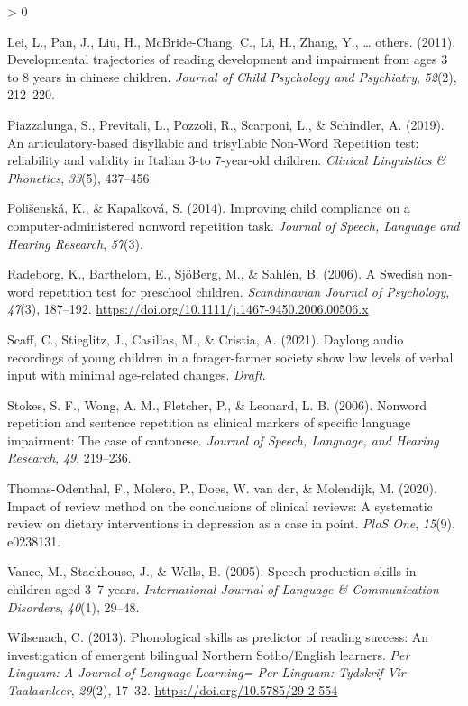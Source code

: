 \documentclass[
  american,
  ,doc,floatsintext]{apa6}
\newlength{\cslhangindent}
\newenvironment{CSLReferences}[2] %
 {%
  \setlength{\parindent}{0pt}
  \ifodd #1 \everypar{\setlength{\hangindent}{\cslhangindent}}\ignorespaces\fi
  \ifnum #2 > 0
  \setlength{\parskip}{#2\baselineskip}
  \fi
 }%
 {}
\begin{document}
\begin{CSLReferences}{1}{0}
\leavevmode\hypertarget{ref-lei2011developmental}{}%
Lei, L., Pan, J., Liu, H., McBride-Chang, C., Li, H., Zhang, Y., \ldots{} others. (2011). Developmental trajectories of reading development and impairment from ages 3 to 8 years in chinese children. \emph{Journal of Child Psychology and Psychiatry}, \emph{52}(2), 212--220.

\leavevmode\hypertarget{ref-piazzalunga2019articulatory}{}%
Piazzalunga, S., Previtali, L., Pozzoli, R., Scarponi, L., \& Schindler, A. (2019). {An articulatory-based disyllabic and trisyllabic Non-Word Repetition test: reliability and validity in Italian 3-to 7-year-old children}. \emph{Clinical Linguistics \& Phonetics}, \emph{33}(5), 437--456.

\leavevmode\hypertarget{ref-polivsenska2014improving}{}%
Polišenská, K., \& Kapalková, S. (2014). Improving child compliance on a computer-administered nonword repetition task. \emph{{Journal of Speech, Language and Hearing Research}}, \emph{57}(3).

\leavevmode\hypertarget{ref-radeborg2006swedish}{}%
Radeborg, K., Barthelom, E., SjöBerg, M., \& Sahlén, B. (2006). {A Swedish non-word repetition test for preschool children}. \emph{{Scandinavian Journal of Psychology}}, \emph{47}(3), 187--192. \url{https://doi.org/10.1111/j.1467-9450.2006.00506.x}

\leavevmode\hypertarget{ref-scaff2021daylong}{}%
Scaff, C., Stieglitz, J., Casillas, M., \& Cristia, A. (2021). Daylong audio recordings of young children in a forager-farmer society show low levels of verbal input with minimal age-related changes. \emph{Draft}.

\leavevmode\hypertarget{ref-stokes2006nonword}{}%
Stokes, S. F., Wong, A. M., Fletcher, P., \& Leonard, L. B. (2006). Nonword repetition and sentence repetition as clinical markers of specific language impairment: The case of cantonese. \emph{Journal of Speech, Language, and Hearing Research}, \emph{49}, 219--236.

\leavevmode\hypertarget{ref-thomas2020impact}{}%
Thomas-Odenthal, F., Molero, P., Does, W. van der, \& Molendijk, M. (2020). Impact of review method on the conclusions of clinical reviews: A systematic review on dietary interventions in depression as a case in point. \emph{PloS One}, \emph{15}(9), e0238131.

\leavevmode\hypertarget{ref-vance2005speech}{}%
Vance, M., Stackhouse, J., \& Wells, B. (2005). Speech-production skills in children aged 3--7 years. \emph{International Journal of Language \& Communication Disorders}, \emph{40}(1), 29--48.

\leavevmode\hypertarget{ref-wilsenach2013phonological}{}%
Wilsenach, C. (2013). {Phonological skills as predictor of reading success: An investigation of emergent bilingual Northern Sotho/English learners}. \emph{{Per Linguam: A Journal of Language Learning= Per Linguam: Tydskrif Vir Taalaanleer}}, \emph{29}(2), 17--32. \url{https://doi.org/10.5785/29-2-554}

\end{CSLReferences}
\end{document}
